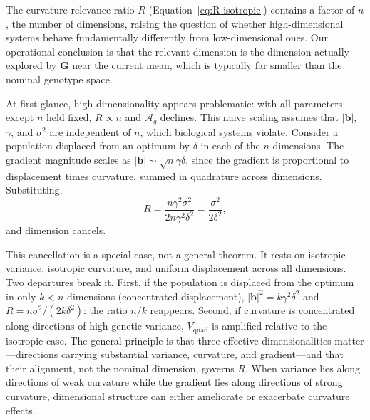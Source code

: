 \documentclass[9pt,twocolumn,twoside,lineno]{gsajnl}
\newcommand{\vect}[1]{\boldsymbol{#1}}
\newcommand{\mat}[1]{\mathbf{#1}}
\newcommand{\Ag}{\ensuremath{\mathcal{A}_{g}}\xspace}
\newcommand{\Vquad}{\ensuremath{V_{\text{quad}}}\xspace}
\begin{document}
The curvature relevance ratio $R$ (Equation~\ref{eq:R-isotropic}) contains a factor of $n$, the number of dimensions, raising the question of whether high-dimensional systems behave fundamentally differently from low-dimensional ones. Our operational conclusion is that the relevant dimension is the dimension actually explored by $\mat{G}$ near the current mean, which is typically far smaller than the nominal genotype space.

At first glance, high dimensionality appears problematic: with all parameters except $n$ held fixed, $R \propto n$ and \Ag declines. This naive scaling assumes that $|\vect{b}|$, $\gamma$, and $\sigma^2$ are independent of $n$, which biological systems violate. Consider a population displaced from an optimum by $\delta$ in each of the $n$ dimensions. The gradient magnitude scales as $|\vect{b}| \sim \sqrt{n}\gamma\delta$, since the gradient is proportional to displacement times curvature, summed in quadrature across dimensions. Substituting,
\begin{equation}
R = \frac{n\gamma^2\sigma^2}{2 n\gamma^2\delta^2} = \frac{\sigma^2}{2\delta^2},
\end{equation}
and dimension cancels.

This cancellation is a special case, not a general theorem. It rests on isotropic variance, isotropic curvature, and uniform displacement across all dimensions. Two departures break it. First, if the population is displaced from the optimum in only $k < n$ dimensions (concentrated displacement), $|\vect{b}|^2 = k\gamma^2\delta^2$ and $R = n\sigma^2/(2k\delta^2)$: the ratio $n/k$ reappears. Second, if curvature is concentrated along directions of high genetic variance, $\Vquad$ is amplified relative to the isotropic case. The general principle is that three effective dimensionalities matter---directions carrying substantial variance, curvature, and gradient---and that their alignment, not the nominal dimension, governs $R$. When variance lies along directions of weak curvature while the gradient lies along directions of strong curvature, dimensional structure can either ameliorate or exacerbate curvature effects.
\end{document}
